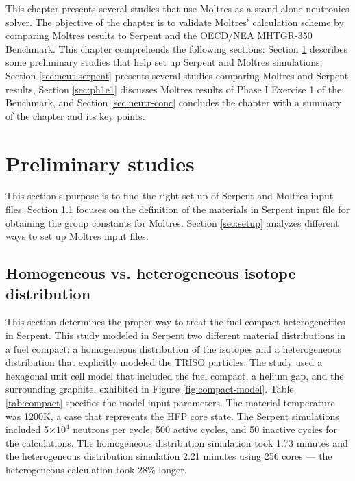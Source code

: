 \label{ch:neutronics}

This chapter presents several studies that use Moltres as a stand-alone neutronics solver.
The objective of the chapter is to validate Moltres' calculation scheme by comparing Moltres results to Serpent and the OECD/NEA MHTGR-350 Benchmark.
This chapter comprehends the following sections: Section \ref{sec:neut-prelim} describes some preliminary studies that help set up Serpent and Moltres simulations, Section \ref{sec:neut-serpent} presents several studies comparing Moltres and Serpent results, Section \ref{sec:ph1e1} discusses Moltres results of Phase I Exercise 1 of the Benchmark, and Section \ref{sec:neutr-conc} concludes the chapter with a summary of the chapter and its key points.

\section{Preliminary studies}
\label{sec:neut-prelim}

This section's purpose is to find the right set up of Serpent and Moltres input files.
Section \ref{sec:homo-hetero} focuses on the definition of the materials in Serpent input file for obtaining the group constants for Moltres.
Section \ref{sec:setup} analyzes different ways to set up Moltres input files.

\subsection{Homogeneous vs. heterogeneous isotope distribution}
\label{sec:homo-hetero}

This section determines the proper way to treat the fuel compact heterogeneities in Serpent.
This study modeled in Serpent two different material distributions in a fuel compact: a homogeneous distribution of the isotopes and a heterogeneous distribution that explicitly modeled the TRISO particles.
The study used a hexagonal unit cell model that included the fuel compact, a helium gap, and the surrounding graphite, exhibited in Figure \ref{fig:compact-model}.
Table \ref{tab:compact} specifies the model input parameters.
The material temperature was 1200K, a case that represents the \gls{HFP} core state.
The Serpent simulations included 5$\times 10^4$ neutrons per cycle, 500 active cycles, and 50 inactive cycles for the calculations.
The homogeneous distribution simulation took 1.73 minutes and the heterogeneous distribution simulation 2.21 minutes using 256 cores --- the heterogeneous calculation took 28$\%$ longer.

